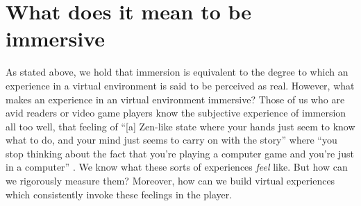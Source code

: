 \section{What does it mean to be immersive}
As stated above, we hold that immersion is equivalent to the degree to which an experience in a virtual environment is said to be perceived as real. However, what makes an experience in an virtual environment immersive? Those of us who are avid readers or video game players know the subjective experience of immersion all too well, that feeling of  ``[a] Zen-like state where your hands just seem to know
what to do, and your mind just seems to carry on with
the story'' \cite{Brown04agrounded} where ``you stop thinking about the fact that you're
playing a computer game and you're just in a computer''  \cite{Brown04agrounded}. We know what these sorts of experiences \textit{feel} like. But how can we rigorously measure them? Moreover, how can we build virtual experiences which consistently invoke these feelings in the player.

